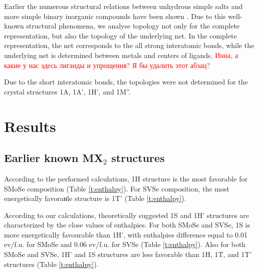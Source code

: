 \documentclass[a4paperm]{article}
\begin{document}
Earlier the numerous structural relations between unhydrous simple salts and more simple binary inorganic compounds have been shown \cite{blatov2011_salts, medrish2020_zintl}. 
Due to this well-known structural phenomena, we analyse topology not only for the complete  representation, but also the topology of the underlying net.
In the complete representation, the net corresponds to the all strong interatomic bonds, while the underlying net is determined between metals and centers of ligands.
\textcolor{red}{Инна, а какие у нас здесь лиганды и упрощения? Я бы удалить этот абзац?}

Due to the short interatomic bonds, the topologies were not determined for the crystal structures 1A, 1A', 1H', and  1M''.


			\section{Results}

\subsection*{Earlier known MX$_2$ structures}

According to the performed calculations, 1H structure is the most favorable for SMoSe composition  (Table \ref{t:enthalpy}).
For SVSe composition, the most energetically favoraиle structure is 1T' (Table \ref{t:enthalpy}). 

According to our calculations, theoretically suggested 1S and 1H' \cite{tang2021_janus,ma2016_fxt} structures are characterized by the close values of enthalpies.
For both SMoSe and SVSe, 1S is more energetically favourable than 1H', with enthalpies difference equal to 0.01 ev/f.u. for SMoSe and 0.06 ev/f.u. for SVSe (Table \ref{t:enthalpy}).
Also for both SMoSe and SVSe, 1H' and 1S structures are less favorable than 1H, 1T, and 1T' structures (Table \ref{t:enthalpy}).
\end{document}
